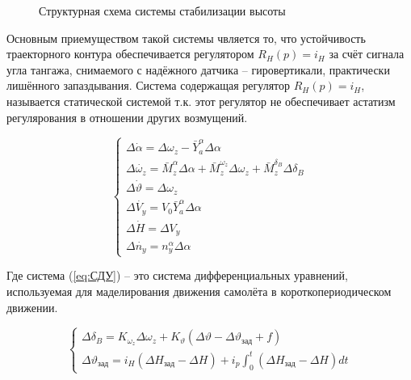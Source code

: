 \documentclass[a4paper,12pt]{article}
\begin{document}
\begin{figure}[H]
    \caption{Структурная схема системы стабилизации высоты}
    \label{fig:2}
\end{figure}

Основным приемуществом такой системы чвляется то, что устойчивость траекторного контура обеспечивается 
регулятором $R_H(p)=i_H$ за счёт сигнала угла тангажа, снимаемого с надёжного датчика -- гировертикали, практически лишённого запаздывания.
Система содержащая регулятор $R_H(p)=i_H$, называется статической системой т.к. этот регулятор не обеспечивает астатизм регулярования в отношении других возмущений. 


\begin{equation}
    \begin{cases}
        \Delta\dot{\alpha}=\Delta\omega_z-\bar{Y}^\alpha_a\Delta\alpha\\
        \Delta\dot{\omega_z} = \bar{M}^\alpha_z\Delta\alpha+\bar{M}^{\omega_z}_z\Delta\omega_z+\bar{M}^{\delta_B}_z\Delta\delta_B\\
        \Delta\dot{\vartheta} = \Delta\omega_z\\
        \Delta\dot{V_y}=V_0\bar{Y}^\alpha_a\Delta\alpha\\
        \Delta\dot{H}=\Delta V_y\\
        \Delta\dot{n_y}=n^\alpha_y\Delta\alpha
    \end{cases}
    \label{eq:СДУ}
\end{equation}

Где система (\ref{eq:СДУ}) -- это система дифференциальных уравнений, используемая для маделирования
движения самолёта в короткопериодическом движении. 

\begin{equation}
    \begin{cases}
        \Delta\delta_B=K_{\omega_z}\Delta\omega_z+K_{\vartheta}(\Delta\vartheta-\Delta\vartheta_\text{зад}+f)\\
        \Delta\vartheta_{\text{зад}} = i_H(\Delta H_{\text{зад}}-\Delta H)+i_p\int_{0}^{t}(\Delta H_{\text{зад}}-\Delta H)dt
    \end{cases}
    \label{eq:заданные значения}
\end{equation}
\end{document}
